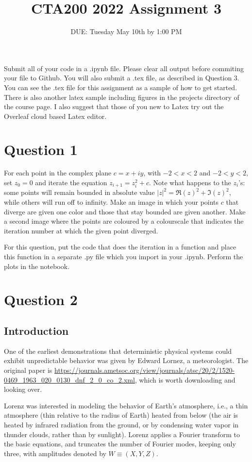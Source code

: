 \documentclass{article}
\title{CTA200 2022 Assignment 3}
\author{DUE: Tuesday May 10th by 1:00 PM}
\date{}
\begin{document}
\maketitle

Submit all of your code in a .ipynb file. Please clear all output before commiting your file to Github. You will also submit a .tex file, as described in Question 3. You can see the .tex file for this assignment as a sample of how to get started. There is also another latex sample including figures in the projects directory of the course page. I also suggest that those of you new to Latex try out the Overleaf cloud based Latex editor.

\section*{Question 1}

For each point in the complex plane $c = x + iy$, with $-2 < x < 2$ and $-2 < y < 2$, set $z_0 = 0$ and iterate the equation $z_{i + 1} = z_i^2 + c$. 
Note what happens to the $z_i$'s: some points will remain bounded in absolute value $|z|^2 = \Re(z)^2 + \Im(z)^2$, while others will run off to infinity. 
Make an image  in which your points $c$ that diverge are given one color and those that stay bounded are given another.
Make a second image where the points are coloured by a colourscale that indicates the iteration number at which the given point diverged.

For this question, put the code that does the iteration in a function and place this function in a separate .py file which you import in your .ipynb.
Perform the plots in the notebook.

\section*{Question 2}

\subsection*{Introduction}
One of the earliest demonstrations that deterministic physical systems could exhibit unpredictable behavior was given by Edward Lornez, a meteorologist. The original paper is \url{https://journals.ametsoc.org/view/journals/atsc/20/2/1520-0469_1963_020_0130_dnf_2_0_co_2.xml}, which is worth downloading and looking over.

Lorenz was interested in modeling the behavior of Earth's atmosphere, i.e., a thin atmosphere (thin relative to the radius of Earth) heated from below (the air is heated by infrared radiation from the ground, or by condensing water vapor in thunder clouds, rather than by sunlight). Lorenz applies a Fourier transform to the basic equations, and truncates the number of Fourier modes, keeping only three, with amplitudes denoted by $W\equiv(X, Y, Z)$.
\end{document}
